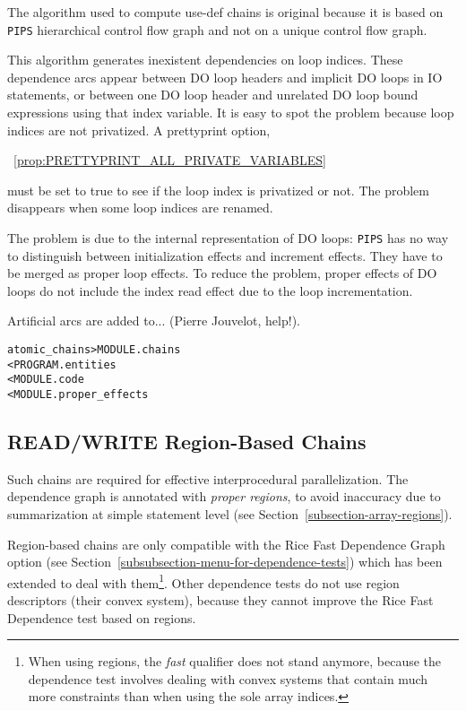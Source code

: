 \documentclass[a4paper]{report}
\newenvironment{PipsMake}{\begin{alltt}}{\end{alltt}}
\newcommand{\PipsPropRef}[1]{\texttt{\detokenize{#1}}~\ref{prop:#1}}
\newenvironment{PipsPass}[1]{\label{pass:#1}}{}
\newcommand{\Pips}{\texttt{PIPS}}
\begin{document}
\begin{PipsPass}{atomic_chains}
The algorithm used to compute use-def chains is original because it is
based on \Pips{} hierarchical control flow graph and not on a unique
control flow graph.

This algorithm generates inexistent dependencies on loop indices. These
dependence arcs appear between DO loop headers and implicit DO loops in
IO statements, or between one DO loop header and unrelated DO loop bound
expressions using that index variable. It is easy to spot the problem
because loop indices are not privatized. A prettyprint option,
\begin{center}
\PipsPropRef{PRETTYPRINT_ALL_PRIVATE_VARIABLES}
\end{center}
must be set to true to see if the loop index is privatized or
not. The problem disappears when some loop indices are renamed.

The problem is due to the internal representation of DO loops: \Pips{} has
no way to distinguish between initialization effects and increment
effects. They have to be merged as proper loop effects. To reduce the
problem, proper effects of DO loops do not include the index read effect
due to the loop incrementation.

Artificial arcs are added to... (Pierre Jouvelot, help!).
\end{PipsPass}

\begin{PipsMake}
atomic_chains                   > MODULE.chains
        < PROGRAM.entities
        < MODULE.code
        < MODULE.proper_effects
\end{PipsMake}

\subsection{READ/WRITE Region-Based Chains}

\begin{PipsPass}{region_chains}
\label{subsubsection-read-write-region-based-chains}

Such chains are required for effective interprocedural parallelization. The
dependence graph is annotated with {\em proper regions}, to avoid inaccuracy
due to summarization at simple statement level (see
Section~\ref{subsection-array-regions}).


Region-based chains are only compatible with the Rice Fast Dependence Graph
option (see Section~\ref{subsubsection-menu-for-dependence-tests})
which has been extended to deal with them\footnote{When using regions,
the {\em fast} qualifier does not stand anymore, because the dependence
test involves dealing with convex systems that contain much more
constraints than when using the sole array indices.}.  Other
dependence tests do not use region descriptors (their convex system),
because they cannot improve the Rice Fast Dependence test based on regions.

\end{PipsPass}
\end{document}
